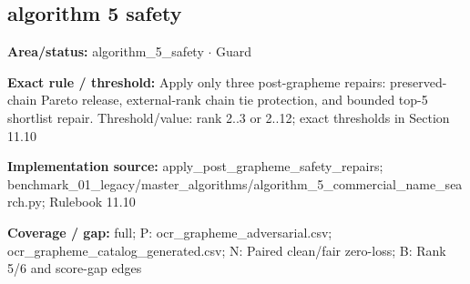 \subsection*{algorithm 5 safety}
\begin{tcolorbox}[enhanced,breakable,colback=white,colframe=Muted!45,boxrule=0.45pt,arc=1.5pt,left=6pt,right=6pt,top=5pt,bottom=5pt,title={\texttt{A5-POST-GRAPHEME-24}},title after break={\texttt{A5-POST-GRAPHEME-24}\ (continued)},fonttitle=\headingfont\bfseries\color{Navy},coltitle=Navy]
\textbf{Area/status:} algorithm\_\allowbreak{}5\_\allowbreak{}safety $\boldsymbol{\cdot}$ Guard\par
\smallskip
\textbf{Exact rule / threshold:} Apply only three post-grapheme repairs: preserved-chain Pareto release, external-rank chain tie protection, and bounded top-5 shortlist repair. Threshold/\allowbreak{}value: rank 2..3 or 2..12; exact thresholds in Section 11.10\par
\smallskip
\textbf{Implementation source:} apply\_\allowbreak{}post\_\allowbreak{}grapheme\_\allowbreak{}safety\_\allowbreak{}repairs; benchmark\_\allowbreak{}01\_\allowbreak{}legacy/\allowbreak{}master\_\allowbreak{}algorithms/\allowbreak{}algorithm\_\allowbreak{}5\_\allowbreak{}commercial\_\allowbreak{}name\_\allowbreak{}search.py; Rulebook 11.10\par
\smallskip
\textbf{Coverage / gap:} full; P: ocr\_\allowbreak{}grapheme\_\allowbreak{}adversarial.csv; ocr\_\allowbreak{}grapheme\_\allowbreak{}catalog\_\allowbreak{}generated.csv; N: Paired clean/\allowbreak{}fair zero-loss; B: Rank 5/\allowbreak{}6 and score-gap edges
\end{tcolorbox}
\medskip
